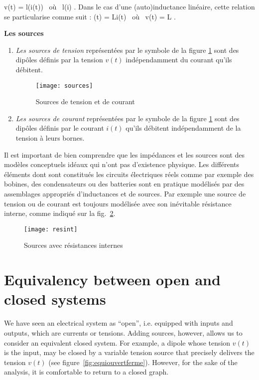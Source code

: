 \begin{description}
\begin{enumerate}
\eqnn
v(t) =  l(i(t)) 
\mbox{ où } l(i) \triangleq  {}.
\eeqnn
Dans le cas d'une (auto)inductance linéaire, cette relation se
particularise comme suit :
\eqnn
\phi(t) = Li(t) \;\; \mbox{ où } v(t) = L .
\eeqnn
\end{enumerate}
\item{\bf Les sources}
\begin{enumerate}
\item {\em Les sources de tension} représentées par le symbole de
la figure \ref{fig:sources} sont des dip{ô}les définis par la
tension $v(t)$ indépendam\-ment du courant qu'ils débitent.
\begin{figure}[htbp]
\begin{center}
\texttt{[image: sources]}
\caption{Sources de tension et de courant}
\label{fig:sources}
\end{center}
\end{figure}
\item{\em Les sources de courant} représentées par le symbole de
la figure \ref{fig:sources} sont des dip{ô}les définis par le
courant $i(t)$ qu'ils débitent indépendamment de la tension à
leurs bornes. 
\end{enumerate} 
\end{description}
Il est important de bien comprendre que les impédances et les sources sont des modèles conceptuels idéaux qui n'ont pas d'existence physique. Les différents éléments dont sont constitués les circuits électriques réels comme par exemple des bobines, des condensateurs ou des batteries sont en pratique modélisés par des assemblages appropriés d'inductances et de sources. Par exemple une source de tension ou de courant est toujours modélisée avec son inévitable résistance interne, comme indiqué sur la fig.~\ref{fig:resint}.

\begin{figure}[t]
\begin{center}
\texttt{[image: resint]}
\caption{Sources avec résistances internes}
\label{fig:resint}
\end{center}
\end{figure}


\section{Equivalency between open and closed systems}

We have seen an electrical system as “open”, i.e. equipped with inputs and outputs, which are currents or tensions.  Adding sources, however, allows us to consider an equivalent closed system.  For example, a dipole whose tension $v(t)$ is the input, may be closed by a variable tension source that precisely delivers the tension $v(t)$ (see figure~\ref{fig:equiouvertferme}).  However, for the sake of the analysis, it is comfortable to return to a closed graph.


